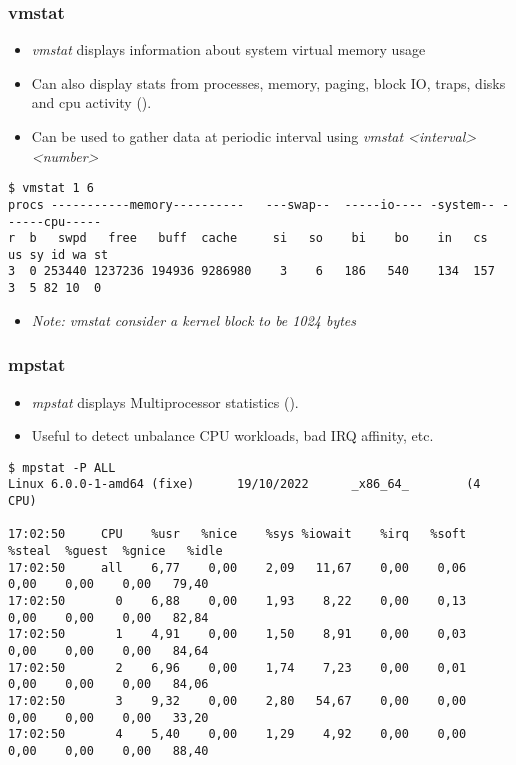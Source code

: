 \begin{frame}[fragile]
  \frametitle{vmstat}
  \begin{itemize}
    \item {\em vmstat} displays information about system virtual memory usage
    \item Can also display stats from processes, memory, paging, block IO,
          traps, disks and cpu activity ().
    \item Can be used to gather data at periodic interval using {\em vmstat <interval> <number>}
  \end{itemize}
  \begin{block}{}
    \begin{verbatim}
$ vmstat 1 6
procs -----------memory----------   ---swap--  -----io---- -system-- ------cpu-----
r  b   swpd   free   buff  cache     si   so    bi    bo    in   cs  us sy id wa st
3  0 253440 1237236 194936 9286980    3    6   186   540    134  157  3  5 82 10  0
    \end{verbatim}
  \end{block}
  \begin{itemize}
    \item {\em Note: vmstat consider a kernel block to be 1024 bytes}
  \end{itemize}
\end{frame}

\begin{frame}[fragile]
  \frametitle{mpstat}
  \begin{itemize}
    \item {\em mpstat} displays Multiprocessor statistics ().
    \item Useful to detect unbalance CPU workloads, bad IRQ affinity, etc.
  \end{itemize}
  \begin{block}{}
    \begin{verbatim}
$ mpstat -P ALL 
Linux 6.0.0-1-amd64 (fixe)      19/10/2022      _x86_64_        (4 CPU)

17:02:50     CPU    %usr   %nice    %sys %iowait    %irq   %soft  %steal  %guest  %gnice   %idle
17:02:50     all    6,77    0,00    2,09   11,67    0,00    0,06    0,00    0,00    0,00   79,40
17:02:50       0    6,88    0,00    1,93    8,22    0,00    0,13    0,00    0,00    0,00   82,84
17:02:50       1    4,91    0,00    1,50    8,91    0,00    0,03    0,00    0,00    0,00   84,64
17:02:50       2    6,96    0,00    1,74    7,23    0,00    0,01    0,00    0,00    0,00   84,06
17:02:50       3    9,32    0,00    2,80   54,67    0,00    0,00    0,00    0,00    0,00   33,20
17:02:50       4    5,40    0,00    1,29    4,92    0,00    0,00    0,00    0,00    0,00   88,40
    \end{verbatim}
  \end{block}
\end{frame}


